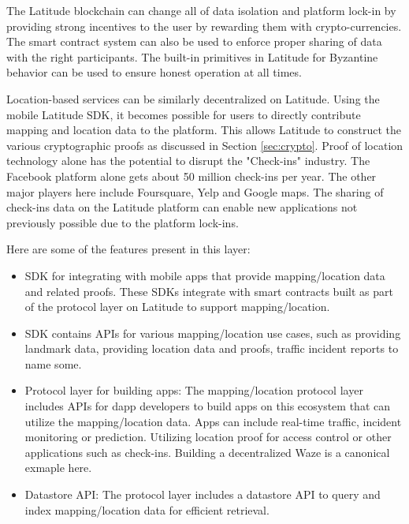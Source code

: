 The Latitude blockchain can change all of data isolation and platform lock-in by providing strong incentives to the user
by rewarding them with crypto-currencies. The smart contract system can also be used to enforce proper sharing of data
with the right participants. The built-in primitives in Latitude for Byzantine behavior can be used to ensure honest
operation at all times.

Location-based services can be similarly decentralized on Latitude. Using the mobile Latitude SDK, it becomes possible
for users to directly contribute mapping and location data to the platform. This allows Latitude to construct the
various cryptographic proofs as discussed in Section \ref{sec:crypto}. Proof of location technology alone has the
potential to disrupt the "Check-ins" industry. The Facebook platform alone gets about 50 million check-ins per year. The
other major players here include Foursquare, Yelp and Google maps. The sharing of check-ins data on the Latitude
platform can enable new applications not previously possible due to the platform lock-ins.

Here are some of the features present in this layer:

\begin{itemize}
    \item SDK for integrating with mobile apps that provide mapping/location data and related proofs. These SDKs
        integrate with smart contracts built as part of the protocol layer on Latitude to support mapping/location.
    \item SDK contains APIs for various mapping/location use cases, such as providing landmark data, providing location
        data and proofs, traffic incident reports to name some.
    \item Protocol layer for building apps: The mapping/location protocol layer includes APIs for dapp developers to
        build apps on this ecosystem that can utilize the mapping/location data. Apps can include real-time traffic,
        incident monitoring or prediction. Utilizing location proof for access control or other applications such as
        check-ins. Building a decentralized Waze is a canonical exmaple here.
    \item Datastore API: The protocol layer includes a datastore API to query and index mapping/location data for
        efficient retrieval.
\end{itemize}

